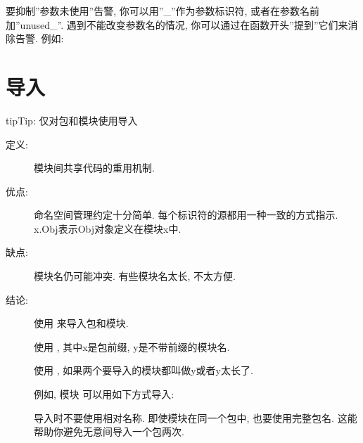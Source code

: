 \documentclass[a4paper,10pt,english]{sphinxmanual}
\begin{document}
\begin{description}
要抑制”参数未使用”告警, 你可以用”\_”作为参数标识符, 或者在参数名前加”unused\_”. 遇到不能改变参数名的情况, 你可以通过在函数开头”提到”它们来消除告警. 例如:

%
\begin{sphinxVerbatim}[commandchars=\\\{\}]
     
       
     
\end{sphinxVerbatim}

\end{description}


\section{导入}
\label{\detokenize{python_language_rules:id1}}
\begin{sphinxadmonition}{tip}{Tip:}
仅对包和模块使用导入
\end{sphinxadmonition}
\begin{description}
\item[{定义:}] \leavevmode
模块间共享代码的重用机制.

\item[{优点:}] \leavevmode
命名空间管理约定十分简单. 每个标识符的源都用一种一致的方式指示. x.Obj表示Obj对象定义在模块x中.

\item[{缺点:}] \leavevmode
模块名仍可能冲突. 有些模块名太长, 不太方便.

\item[{结论:}] \leavevmode
使用  来导入包和模块.

使用  , 其中x是包前缀, y是不带前缀的模块名.

使用 , 如果两个要导入的模块都叫做y或者y太长了.

例如, 模块  可以用如下方式导入:

%
\begin{sphinxVerbatim}[commandchars=\\\{\}]
   
   
\end{sphinxVerbatim}

导入时不要使用相对名称. 即使模块在同一个包中, 也要使用完整包名. 这能帮助你避免无意间导入一个包两次.

\end{description}
\end{document}
